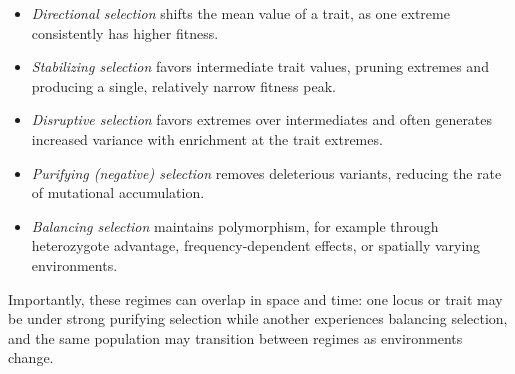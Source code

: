 \begin{itemize}
    \item \emph{Directional selection} shifts the mean value of a trait, as one extreme consistently has higher fitness.
    \item \emph{Stabilizing selection} favors intermediate trait values, pruning extremes and producing a single, relatively narrow fitness peak.
    \item \emph{Disruptive selection} favors extremes over intermediates and often generates increased variance with enrichment at the trait extremes.
    \item \emph{Purifying (negative) selection} removes deleterious variants, reducing the rate of mutational accumulation.
    \item \emph{Balancing selection} maintains polymorphism, for example through heterozygote advantage, frequency-dependent effects, or spatially varying environments.
\end{itemize}

Importantly, these regimes can overlap in space and time: one locus or trait may be under strong purifying selection while another experiences balancing selection, and the same population may transition between regimes as environments change.

